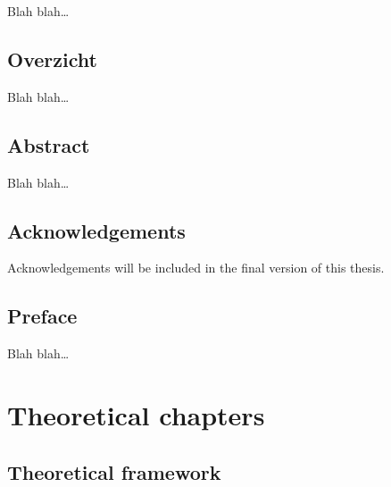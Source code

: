 \documentclass[a4paper,12pt,oneside,oldfontcommands]{memoir}
\newcommand{\initial}[1]{
	\lettrine[lines=3,lhang=0.33,nindent=0em]{
		\color{gray}
     		{\textsc{#1}}}{}}
\newcommand\blankpage{%
    \null
    \thispagestyle{empty}%
    \newpage}
\begin{document}
\initial{B}lah blah\ldots{}

\afterpage{\blankpage}

\chapter*{Overzicht}\label{overzicht}

\initial{B}lah blah\ldots{}

\chapter*{Abstract}\label{abstract}

\initial{B}lah blah\ldots{}

\afterpage{\blankpage}

\chapter*{Acknowledgements}\label{acknowledgements}

\initial{A}cknowledgements will be included in the final version of this
thesis.

\afterpage{\blankpage}

\chapter*{Preface}\label{preface}

\initial{B}lah blah\ldots{}

\afterpage{\blankpage}

\part{Theoretical chapters}\label{part-theoretical-chapters}

\chapter{Theoretical framework}\label{intro}

\end{document}
